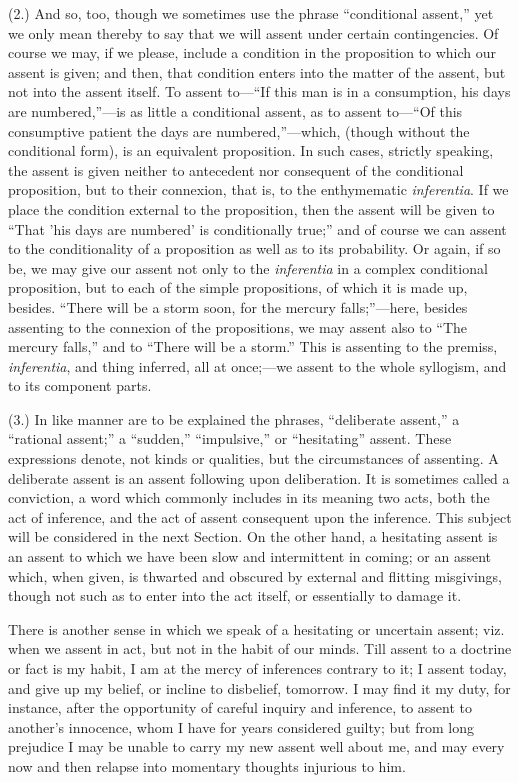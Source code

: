 (2.) And so, too, though we sometimes use the phrase
``conditional assent,'' yet we only mean thereby to say that
we will assent under certain contingencies. Of course we may, if we
please, include a condition in the proposition to which our assent is
given; and then, that condition enters into the matter of the assent,
but not into the assent itself. To assent to—``If this man is in
a consumption, his days are numbered,''—is as little a
conditional assent, as to assent to—``Of this consumptive
patient the days are numbered,''—which, (though without the
conditional form), is an equivalent proposition. In such cases,
strictly speaking, the assent is given neither to antecedent nor
consequent of the conditional proposition, but to their connexion,
that is, to the enthymematic \emph{inferentia}. If we place the
condition external to the proposition, then the assent will be given
to ``That 'his days are numbered' is conditionally true;'' and
of course we can assent to the conditionality of a proposition as well
as to its probability. Or again, if so be, we may give our assent not
only to the \emph{inferentia} in a complex conditional proposition,
but to each of the simple propositions, of which it is made up,
besides. ``There will be a storm soon, for the mercury
falls;''—here, besides assenting to the connexion of the
propositions, we may assent also to ``The mercury falls,'' and
to ``There will be a storm.'' This is assenting to the premiss,
\emph{inferentia}, and thing inferred, all at once;—we assent to the
whole syllogism, and to its component parts.

(3.) In like manner are to be explained the phrases,
``deliberate assent,'' a ``rational assent;'' a
``sudden,'' ``impulsive,'' or ``hesitating''
assent. These expressions denote, not kinds or qualities, but the
circumstances of assenting. A deliberate assent is an assent following
upon deliberation. It is sometimes called a conviction, a word which
commonly includes in its meaning two acts, both the act of inference,
and the act of assent consequent upon the inference. This subject will
be considered in the next Section. On the other hand, a hesitating
assent is an assent to which we have been slow and intermittent in
coming; or an assent which, when given, is thwarted and obscured by external and flitting misgivings, though not such as to enter into
the act itself, or essentially to damage it.

There is another sense in which we speak of a hesitating or
uncertain assent; viz. when we assent in act, but not in the habit of
our minds. Till assent to a doctrine or fact is my habit, I am at the
mercy of inferences contrary to it; I assent today, and give up my
belief, or incline to disbelief, tomorrow. I may find it my duty, for
instance, after the opportunity of careful inquiry and inference, to
assent to another's innocence, whom I have for years considered
guilty; but from long prejudice I may be unable to carry my new assent
well about me, and may every now and then relapse into momentary
thoughts injurious to him.


